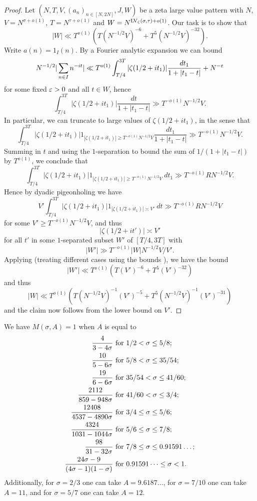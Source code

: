 \begin{proof} Let $(N,T,V,(a_n)_{n \in [N,2N]},J,W)$ be a zeta large value pattern with $N$, $V = N^{\sigma+o(1)}$, $T = N^{\tau+o(1)}$ and $W = N^{\mathrm{LV}_\zeta(\sigma,\tau)+o(1)}$.
Our task is to show that
$$ |W| \ll T^{o(1)} ( T (N^{-1/2} V)^{-6} + T^5 (N^{-1/2} V)^{-32}).$$
Write $a(n) = 1_I(n)$. By a Fourier analytic expansion we can bound
$$ N^{-1/2} |\sum_{n \in I} n^{-it}| \ll T^{o(1)} \int_{T/4}^{3T} |\zeta(1/2+it_1)| \frac{dt_1}{1+|t_1-t|} + N^{-\varepsilon}$$
for some fixed $\varepsilon>0$ and all $t \in W$, hence
$$ \int_{T/4}^{3T} |\zeta(1/2+it_1)| \frac{dt}{1+|t_1-t|} \gg T^{-o(1)} N^{-1/2} V.$$
In particular, we can truncate to large values of $\zeta(1/2+it_1)$, in the sense that
$$ \int_{T/4}^{3T} |\zeta(1/2+it_1)| 1_{|\zeta(1/2+it_1)| \geq T^{-o(1)} N^{-1/2} V} \frac{dt_1}{1+|t_1-t|} \gg T^{-o(1)} N^{-1/2} V.$$
Summing in $t$ and using the $1$-separation to bound the sum of $1/(1+|t_1-t|)$ by $T^{o(1)}$, we conclude that
$$ \int_{T/4}^{3T} |\zeta(1/2+it_1)| 1_{|\zeta(1/2+it_1)| \geq T^{-o(1)} N^{-1/2} V} \ dt_1 \gg T^{-o(1)} R N^{-1/2} V.$$
Hence by dyadic pigeonholing we have
$$ V' \int_{T/4}^{3T} |\zeta(1/2+it_1)| 1_{|\zeta(1/2+it_1)| \asymp V'} \ dt \gg T^{-o(1)} R N^{-1/2} V$$
for some $V' \geq T^{-o(1)} N^{-1/2} V$, and thus
$$ |\zeta(1/2+it')| \asymp V'$$
for all $t'$ in some $1$-separated subset $W'$ of $[T/4, 3T]$ with
$$ |W'| \gg T^{-o(1)} |W| N^{-1/2} V / V'.$$
Applying \cite[Theorem 2]{heathbrown_twelfth_1978} (treating different cases using the bounds \cite[(7), (8), (9)]{heathbrown_twelfth_1978}), we have the bound
$$ |W'| \ll T^{o(1)} ( T (V')^{-6} + T^5 (V')^{-32})$$
and thus
$$ |W| \ll T^{o(1)} ( T (N^{-1/2} V)^{-1} (V')^{-5} + T^5 (N^{-1/2} V)^{-1} (V')^{-31})$$
and the claim now follows from the lower bound on $V'$.
\end{proof}

\begin{lemma}\label{ivic-moment}\cite[Theorem 8.4]{ivic}  We have $M(\sigma,A) = 1$ when $A$ is equal to
\begin{align*}
    \frac{4}{3-4\sigma} & \hbox{ for } 1/2 < \sigma \leq 5/8; \\
    \frac{10}{5-6\sigma} & \hbox{ for } 5/8 < \sigma \leq 35/54; \\
    \frac{19}{6-6\sigma} & \hbox{ for } 35/54 < \sigma \leq 41/60; \\
    \frac{2112}{859-948\sigma} & \hbox{ for } 41/60 < \sigma \leq 3/4;\\
    \frac{12408}{4537-4890\sigma} & \hbox{ for } 3/4 \leq \sigma \leq 5/6; \\
    \frac{4324}{1031-1044\sigma} & \hbox{ for } 5/6 \leq \sigma \leq 7/8; \\
    \frac{98}{31-32\sigma} & \hbox{ for } 7/8 \leq \sigma \leq 0.91591\dots; \\
    \frac{24\sigma-9}{(4\sigma-1)(1-\sigma)} & \hbox{ for } 0.91591\dots \leq \sigma < 1.
\end{align*}
Additionally, for $\sigma=2/3$ one can take $A = 9.6187\dots$, for $\sigma = 7/10$ one can take $A=11$, and for $\sigma=5/7$ one can take $A=12$.
\end{lemma}

